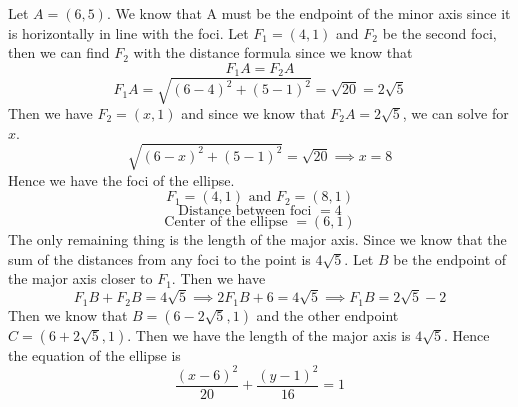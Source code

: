 \documentclass{article}
\begin{document}
\section{}
Let $A = (6,5)$. We know that A must be the endpoint of the minor axis since it is horizontally in line with the foci. Let $F_1 = (4,1)$ and $F_2$ be the second foci, then we can find $F_2$ with the distance formula since we know that 
\[F_1 A = F_2 A\]
\[F_1 A = \sqrt{(6-4)^2 + (5-1)^2} = \sqrt{20} = 2\sqrt{5}\]
Then we have $F_2 = (x, 1)$ and since we know that \(F_2 A = 2\sqrt{5}\), we can solve for $x$. 
\[\sqrt{(6-x)^2 + (5-1)^2} = \sqrt{20} \implies x = 8\]
Hence we have the foci of the ellipse. 
\[F_1 = (4,1) \text{ and } F_2 = (8,1)\]
\[\text{Distance between foci } = 4\]
\[\text{Center of the ellipse } = (6,1)\]
The only remaining thing is the length of the major axis. Since we know that the sum of the distances from any foci to the point is \(4\sqrt{5}\). Let $B$ be the endpoint of the major axis closer to $F_1$. Then we have 
\[F_1 B + F_2 B = 4\sqrt{5} \implies 2F_1 B + 6 = 4\sqrt{5} \implies F_1 B = 2\sqrt{5} - 2\]
Then we know that $B = (6-2\sqrt{5},1)$ and the other endpoint $C = (6+2\sqrt{5},1)$. Then we have the length of the major axis is $4\sqrt{5}$. Hence the equation of the ellipse is 
\[\frac{(x-6)^2}{20} + \frac{(y-1)^2}{16} = 1\]
\end{document}

